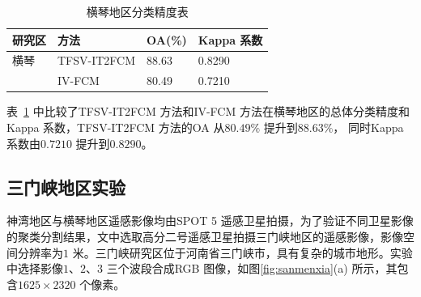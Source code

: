 \begin{table}[htbp]
    \caption{横琴地区分类精度表}\label{tab:hengqin_oa}
    \centering
    \begin{tabular}{llll}
        \toprule
        研究区 & 方法        & OA(\%) & Kappa 系数 \\
        \midrule
        横琴   & TFSV-IT2FCM & 88.63  & 0.8290     \\
               & IV-FCM      & 80.49  & 0.7210     \\
        \bottomrule
    \end{tabular}
\end{table}

表~\ref{tab:hengqin_oa} 中比较了TFSV-IT2FCM 方法和IV-FCM 方法在横琴地区的总体分类精度和Kappa 系数，TFSV-IT2FCM 方法的OA 从$80.49\%$ 提升到$88.63\%$， 同时Kappa 系数由$0.7210$ 提升到$0.8290$。

\subsection{三门峡地区实验}
\label{subsec::chap03-4-1}
神湾地区与横琴地区遥感影像均由SPOT 5 遥感卫星拍摄，为了验证不同卫星影像的聚类分割结果，文中选取高分二号遥感卫星拍摄三门峡地区的遥感影像，影像空间分辨率为$1$ 米。三门峡研究区位于河南省三门峡市，具有复杂的城市地形。实验中选择影像$1$、$2$、$3$ 三个波段合成RGB 图像，如图\ref{fig:sanmenxia}(a) 所示，其包含$1625 \times 2320$ 个像素。



